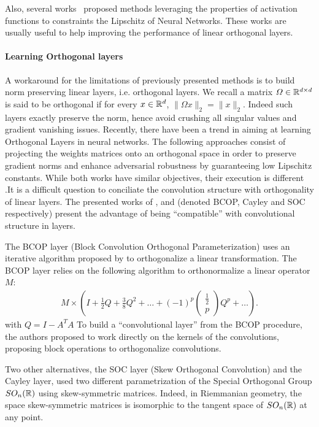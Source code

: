 Also, several works~\cite{anil2019sorting,singla2021householder,huang2021local} proposed methods leveraging the properties of activation functions to constraints the Lipschitz of Neural Networks. These works are usually useful to help  improving the performance of linear orthogonal layers.



\paragraph{Learning Orthogonal layers} A workaround for the limitations of previously presented methods is to build norm preserving linear layers, i.e. orthogonal layers. We recall a matrix $\Omega\in\mathbb{R}^{d\times d}$ is said to be orthogonal if for every $x\in\mathbb{R}^d$, $\lVert\Omega x\rVert_2 = \lVert x\rVert_2$. Indeed such layers exactly preserve the norm, hence avoid crushing all singular values and gradient vanishing issues. Recently, there have been a trend in aiming at learning Orthogonal Layers in neural networks.  The following approaches consist of projecting the weights matrices onto an orthogonal space in order to preserve gradient norms and enhance adversarial robustness by guaranteeing low Lipschitz constants. While both works have similar objectives, their execution is different .It is a difficult question to conciliate the convolution structure with orthogonality of linear layers. The presented works of \citet{li2019preventing}, \citet{trockman2021orthogonalizing} and \citet{skew2021sahil} (denoted BCOP, Cayley and SOC respectively) present the advantage of being ``compatible''  with convolutional structure in layers. 

The BCOP layer (Block Convolution Orthogonal Parameterization) uses an iterative algorithm proposed by \citet{bjorck1971iterative} to orthogonalize a linear transformation. The BCOP layer relies on the following algorithm to orthonormalize a linear operator $M$:
\begin{align*}
 M\times\left(I+\frac12Q+\frac38Q^2+\dots+(-1)^p\begin{pmatrix} \frac12\\p \end{pmatrix}
Q^p+\dots \right).
\end{align*}
with $Q = I-A^TA$ 
To build a ``convolutional layer'' from the BCOP procedure, the authors proposed to work directly on the kernels of the convolutions, proposing block operations to orthogonalize convolutions.

Two other alternatives, the SOC layer (Skew Orthogonal Convolution) and the Cayley layer, used two different parametrization of the Special Orthogonal Group $SO_n(\mathbb{R})$ using skew-symmetric matrices. Indeed, in Riemmanian geometry, the space skew-symmetric matrices is isomorphic to the tangent space of $SO_n(\mathbb{R})$ at any point. 

